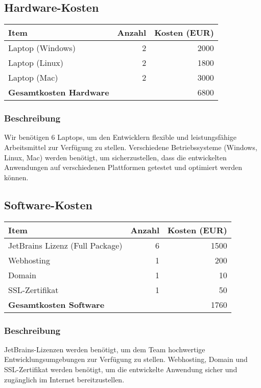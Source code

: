 \subsection*{Hardware-Kosten}
\begin{tabular}{lrr}
  \toprule
  \textbf{Item} & \textbf{Anzahl} & \textbf{Kosten (EUR)} \\
  \midrule
  Laptop (Windows) & 2 & 2000 \\
  Laptop (Linux) & 2 & 1800 \\
  Laptop (Mac) & 2 & 3000 \\
  \midrule
  \textbf{Gesamtkosten Hardware} & & 6800 \\
  \bottomrule
\end{tabular}

\subsubsection*{Beschreibung}
Wir benötigen 6 Laptops, um den Entwicklern flexible und leistungsfähige Arbeitsmittel zur Verfügung zu stellen. Verschiedene Betriebssysteme (Windows, Linux, Mac) werden benötigt, um sicherzustellen, dass die entwickelten Anwendungen auf verschiedenen Plattformen getestet und optimiert werden können.

\subsection*{Software-Kosten}
\begin{tabular}{lrr}
  \toprule
  \textbf{Item} & \textbf{Anzahl} & \textbf{Kosten (EUR)} \\
  \midrule
  JetBrains Lizenz (Full Package) & 6 & 1500 \\
  Webhosting & 1 & 200 \\
  Domain & 1 & 10 \\
  SSL-Zertifikat & 1 & 50 \\
  \midrule
  \textbf{Gesamtkosten Software} & & 1760 \\
  \bottomrule
\end{tabular}

\subsubsection*{Beschreibung}
JetBrains-Lizenzen werden benötigt, um dem Team hochwertige Entwicklungsumgebungen zur Verfügung zu stellen. Webhosting, Domain und SSL-Zertifikat werden benötigt, um die entwickelte Anwendung sicher und zugänglich im Internet bereitzustellen.

